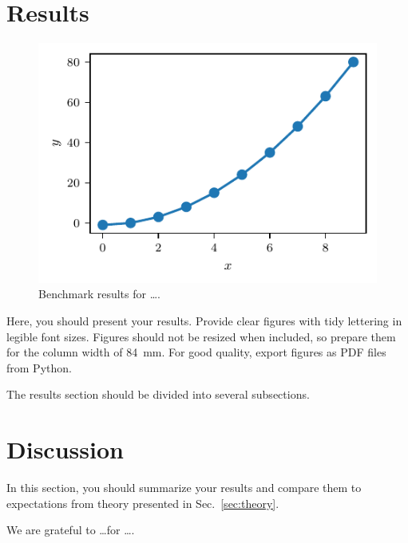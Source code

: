\documentclass[sigconf, nonacm, natbib, screen, balance=False]{acmart}
\begin{document}
\section{Results}\label{sec:results}

\begin{figure}
  \centering
  \includegraphics{sample_plot}
  \caption{Benchmark results for \dots.}
  \label{fig:bench}
\end{figure}

Here, you should present your results. Provide clear figures with tidy
lettering in legible font sizes. Figures should not be resized when
included, so prepare them for the column width of 84~mm. For good
quality, export figures as PDF files from Python.

The results section should be divided into several subsections.

\section{Discussion}\label{sec:discussion}

In this section, you should summarize your results and compare them to
expectations from theory presented in Sec.~\ref{sec:theory}.

\begin{acks}
We are grateful to \dots for \dots.
\end{acks}




\end{document}
